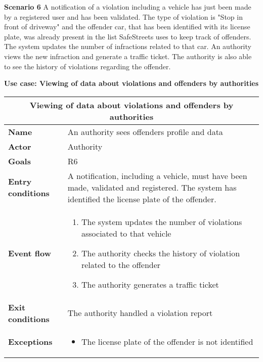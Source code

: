 \begin{description}
    \item \label{scenario6} \textbf{Scenario 6} \newline
        A notification of a violation including a vehicle has just been made by a registered user and has been validated. The type of violation is "Stop in front of driveway" and the offender car, that has been identified with its license plate, was already present in the list SafeStreets uses to keep track of offenders. The system updates the number of infractions related to that car. An authority views the new infraction and generate a traffic ticket. The authority is also able to see the history of violations regarding the offender.

    \item \textbf{Use case: Viewing of data about violations and offenders by authorities}
    \begin{center}
        \begin{tabular}{|p{3cm}|p{7cm}|}
            \multicolumn{2}{c}{\textbf{Viewing of data about violations and offenders by authorities}} \\
            \hline
            \textbf{Name} & An authority sees offenders profile and data \\
            \hline
            \textbf{Actor} & Authority \\
            \hline
            \textbf{Goals} & R6 \\
            \hline
            \textbf{Entry conditions} & A notification, including a vehicle, must have been made, validated and registered.
            The system has identified the license plate of the offender. \\
            \hline
            \textbf{Event flow} &
            \begin{enumerate}
                \item The system updates the number of violations associated to that vehicle
                \item The authority checks the history of violation related to the offender
                \item The authority generates a traffic ticket
            \end{enumerate} \\
            \hline
            \textbf{Exit conditions} & The authority handled a violation report \\
            \hline
            \textbf{Exceptions}
            & \begin{itemize}
                \item The license plate of the offender is not identified
            \end{itemize} \\
            \hline
        \end{tabular}
    \end{center}
\end{description}

